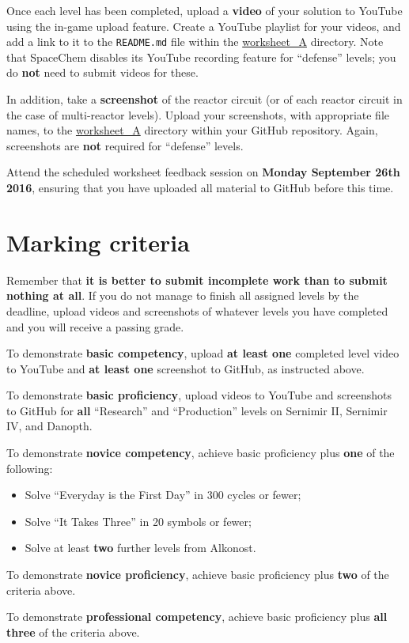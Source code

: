 \documentclass{../../fal_assignment}
\begin{document}
Once each level has been completed, upload a \textbf{video} of your solution to YouTube using the in-game upload feature.
Create a YouTube playlist for your videos, and add a link to it to the \texttt{README.md} file within the \url{worksheet_A} directory.
Note that SpaceChem disables its YouTube recording feature for ``defense'' levels; you do \textbf{not} need to submit videos for these.

In addition, take a \textbf{screenshot} of the reactor circuit (or of each reactor circuit in the case of multi-reactor levels). Upload your screenshots, with appropriate file names, to the \url{worksheet_A} directory within your GitHub repository. Again, screenshots are \textbf{not} required for ``defense'' levels.

Attend the scheduled worksheet feedback session on \textbf{Monday September 26th 2016},
ensuring that you have uploaded all material to GitHub before this time.

\section*{Marking criteria}

Remember that \textbf{it is better to submit incomplete work than to submit nothing at all}. If you do not manage to finish all assigned levels by the deadline, upload videos and screenshots of whatever levels you have completed and you will receive a passing grade.

To demonstrate \textbf{basic competency}, upload \textbf{at least one} completed level video to YouTube and \textbf{at least one} screenshot to GitHub, as instructed above.

To demonstrate \textbf{basic proficiency}, upload videos to YouTube and screenshots to GitHub for \textbf{all} ``Research'' and ``Production'' levels on Sernimir II, Sernimir IV, and Danopth.

To demonstrate \textbf{novice competency}, achieve basic proficiency plus \textbf{one} of the following:
	\begin{itemize}
		\item Solve ``Everyday is the First Day'' in 300 cycles or fewer;
		\item Solve ``It Takes Three'' in 20 symbols or fewer;
		\item Solve at least \textbf{two} further levels from Alkonost.
	\end{itemize}

To demonstrate \textbf{novice proficiency}, achieve basic proficiency plus \textbf{two} of the criteria above.

To demonstrate \textbf{professional competency}, achieve basic proficiency plus \textbf{all three} of the criteria above.
\end{document}
